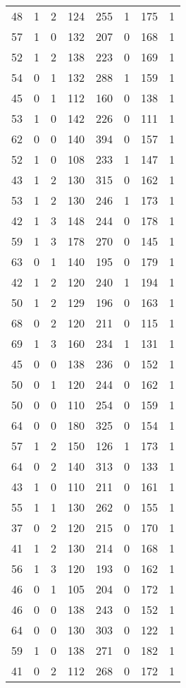 \documentclass{article}
\begin{document}
\begin{longtable}{*{8}{c}}
48 & 1 & 2 & 124 & 255 & 1 & 175 & 1 \\
57 & 1 & 0 & 132 & 207 & 0 & 168 & 1 \\
52 & 1 & 2 & 138 & 223 & 0 & 169 & 1 \\
54 & 0 & 1 & 132 & 288 & 1 & 159 & 1 \\
45 & 0 & 1 & 112 & 160 & 0 & 138 & 1 \\
53 & 1 & 0 & 142 & 226 & 0 & 111 & 1 \\
62 & 0 & 0 & 140 & 394 & 0 & 157 & 1 \\
52 & 1 & 0 & 108 & 233 & 1 & 147 & 1 \\
43 & 1 & 2 & 130 & 315 & 0 & 162 & 1 \\
53 & 1 & 2 & 130 & 246 & 1 & 173 & 1 \\
42 & 1 & 3 & 148 & 244 & 0 & 178 & 1 \\
59 & 1 & 3 & 178 & 270 & 0 & 145 & 1 \\
63 & 0 & 1 & 140 & 195 & 0 & 179 & 1 \\
42 & 1 & 2 & 120 & 240 & 1 & 194 & 1 \\
50 & 1 & 2 & 129 & 196 & 0 & 163 & 1 \\
68 & 0 & 2 & 120 & 211 & 0 & 115 & 1 \\
69 & 1 & 3 & 160 & 234 & 1 & 131 & 1 \\
45 & 0 & 0 & 138 & 236 & 0 & 152 & 1 \\
50 & 0 & 1 & 120 & 244 & 0 & 162 & 1 \\
50 & 0 & 0 & 110 & 254 & 0 & 159 & 1 \\
64 & 0 & 0 & 180 & 325 & 0 & 154 & 1 \\
57 & 1 & 2 & 150 & 126 & 1 & 173 & 1 \\
64 & 0 & 2 & 140 & 313 & 0 & 133 & 1 \\
43 & 1 & 0 & 110 & 211 & 0 & 161 & 1 \\
55 & 1 & 1 & 130 & 262 & 0 & 155 & 1 \\
37 & 0 & 2 & 120 & 215 & 0 & 170 & 1 \\
41 & 1 & 2 & 130 & 214 & 0 & 168 & 1 \\
56 & 1 & 3 & 120 & 193 & 0 & 162 & 1 \\
46 & 0 & 1 & 105 & 204 & 0 & 172 & 1 \\
46 & 0 & 0 & 138 & 243 & 0 & 152 & 1 \\
64 & 0 & 0 & 130 & 303 & 0 & 122 & 1 \\
59 & 1 & 0 & 138 & 271 & 0 & 182 & 1 \\
41 & 0 & 2 & 112 & 268 & 0 & 172 & 1 \\

\end{longtable}
\end{document}
